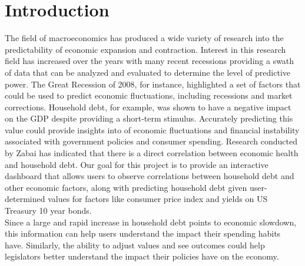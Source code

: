 \documentclass[sigconf,nonacm,11pt]{acmart}
\begin{document}
\section{Introduction}

The field of macroeconomics has produced a wide variety of research into the predictability of economic expansion and contraction. Interest in this research field has increased over the years with many recent recessions providing a swath of data that can be analyzed and evaluated to determine the level of predictive power. The Great Recession of 2008, for instance, highlighted a set of factors that could be used to predict economic fluctuations, including recessions and market corrections.  Household debt, for example, was shown to have a negative impact on the GDP despite providing a short-term stimulus\cite{Kim2016}.  Accurately predicting this value could provide insights into of economic fluctuations and financial instability associated with government policies and consumer spending.  Research conducted by Zabai\cite{Zabai2017} has indicated that there is a direct correlation between economic health and household debt. Our goal for this project is to provide an interactive dashboard that allows users to observe correlations between household debt and other economic factors, along with predicting household debt given user-determined values for factors like consumer price index and yields on US Treasury 10 year bonds.\\
Since a large and rapid increase in household debt points to economic slowdown\cite{Mian2018}, this information can help users understand the impact their spending habits have. Similarly, the ability to adjust values and see outcomes could help legislators better understand the impact their policies have on the economy\cite{Garber2018}.\vspace{-1em}


\end{document}
